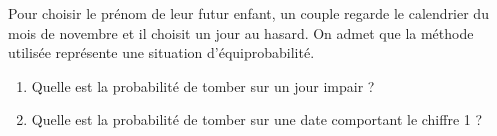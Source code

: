 
Pour choisir le prénom de leur futur enfant, un couple regarde le calendrier du mois de novembre et il choisit un jour au hasard. On admet que la méthode utilisée représente une situation d'équiprobabilité.


\begin{enumerate}
\item Quelle est la probabilité de tomber sur un jour impair ?
\item Quelle est la probabilité de tomber sur une date comportant le chiffre 1 ?
\end{enumerate}